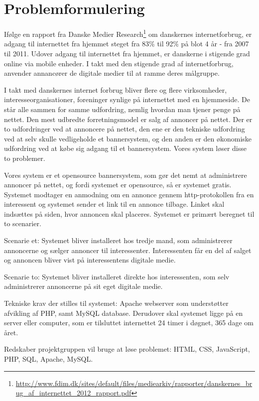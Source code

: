 \documentclass[a4paper,12pt]{article}
\begin{document}
\section{Problemformulering}

Ifølge en rapport fra Danske Medier Research\footnote{\url{ http://www.fdim.dk/sites/default/files/mediearkiv/rapporter/danskernes\_brug\_af\_internettet\_2012\_rapport.pdf}} om danskernes internetforbrug, er adgang til internettet fra hjemmet steget fra 83\% til 92\% på blot 4 år - fra 2007 til 2011. Udover adgang til internettet fra hjemmet, er danskerne i stigende grad online via mobile enheder. I takt med den stigende grad af internetforbrug, anvender annancører de digitale medier til at ramme deres målgruppe.

I takt med danskernes internet forbrug bliver flere og flere virksomheder, interesseorganisationer, foreninger synlige på internettet med en hjemmeside. De står alle sammen for samme udfordring, nemlig hvordan man tjener penge på nettet. Den mest udbredte forretningsmodel er salg af annoncer på nettet. Der er to udfordringer ved at annoncere på nettet, den ene er den tekniske udfordring ved at selv skulle vedligeholde et bannersystem, og den anden er den økonomiske udfordring ved at købe sig adgang til et bannersystem. Vores system løser disse to problemer.

Vores system er et opensource bannersystem, som gør det nemt at administrere annoncer på nettet, og fordi systemet er opensource, så er systemet gratis. Systemet modtager en anmodning om en annonce gennem http-protokollen fra en interessent og systemet sender et link til en annonce tilbage. Linket skal indsættes på siden, hvor annoncen skal placeres. Systemet er primært beregnet til to scenarier.

Scenarie et: Systemet bliver installeret hos tredje mand, som administrerer annoncerne og sælger annoncer til interessenter. Interessenten får en del af salget og annoncen bliver vist på interessentens digitale medie.

Scenarie to: Systemet bliver installeret direkte hos interessenten, som selv administrerer annoncerne på sit eget digitale medie.

Tekniske krav der stilles til systemet: Apache webserver som understøtter afvikling af PHP, samt MySQL database. Derudover skal systemet ligge på en server eller computer, som er tilsluttet internettet 24 timer i døgnet, 365 dage om året.

Redskaber projektgruppen vil bruge at løse problemet: HTML, CSS, JavaScript, PHP, SQL, Apache, MySQL.
\end{document}
